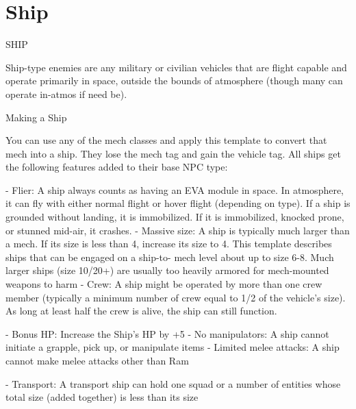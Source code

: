 \section{Ship}
                                                    SHIP

Ship-type enemies are any military or civilian vehicles that are flight capable and operate primarily
in space, outside the bounds of atmosphere (though many can operate in-atmos if need be).


Making a Ship

You can use any of the mech classes and apply this template to convert that mech into a ship.
They lose the mech tag and gain the vehicle tag. All ships get the following features added to
their base NPC type:

    -    Flier: A ship always counts as having an EVA module in space. In atmosphere, it can fly
        with either normal flight or hover flight (depending on type). If a ship is grounded without
         landing, it is immobilized. If it is immobilized, knocked prone, or stunned mid-air, it
        crashes.
    -    Massive size: A ship is typically much larger than a mech. If its size is less than 4,
         increase its size to 4. This template describes ships that can be engaged on a ship-to-
         mech level about up to size 6-8. Much larger ships (size 10/20+) are usually too heavily
        armored for mech-mounted weapons to harm
    -   Crew: A ship might be operated by more than one crew member (typically a minimum
         number of crew equal to 1/2 of the vehicle’s size). As long at least half the crew is alive, the
        ship can still function.

    -    Bonus HP: Increase the Ship’s HP by +5
    -    No manipulators: A ship cannot initiate a grapple, pick up, or manipulate items
    -    Limited melee attacks: A ship cannot make melee attacks other than Ram





-   Transport: A transport ship can hold one squad or a number of entities whose total size
    (added together) is less than its size

